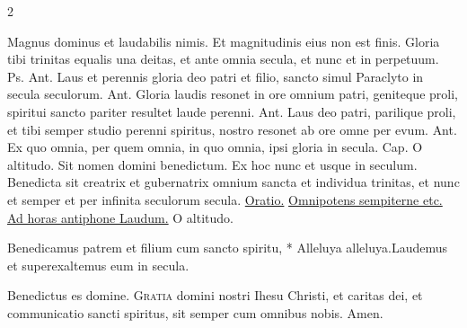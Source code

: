 \begin{multicols*}{2}
\begin{responsory-doxology}
\end{responsory-doxology}%
\newline \V Magnus dominus et laudabilis nimis. \R Et magnitudinis eius non est finis.
 Gloria tibi trinitas equalis una deitas, et ante omnia secula, et nunc et in perpetuum. {\color{Red} Ps.}  {\color{Red} Ant.} Laus et perennis gloria deo patri et filio, sancto simul Paraclyto in secula seculorum. {\color{Red} Ant.} Gloria laudis resonet in ore omnium patri, geniteque proli, spiritui sancto pariter resultet laude perenni. {\color{Red} Ant.} Laus deo patri, parilique proli, et tibi semper studio perenni spiritus, nostro resonet ab ore omne per evum. {\color{Red} Ant.} Ex quo omnia, per quem omnia, in quo omnia, ipsi gloria in secula. {\color{Red} Cap.} O altitudo.
\newline \V Sit nomen domini benedictum. \R Ex hoc nunc et usque in seculum.
 Benedicta sit creatrix et gubernatrix omnium sancta et individua trinitas, et nunc et semper et per infinita seculorum secula.
\newline \ul{Oratio.} \hyperlink{omnipotens-trinitas}{Omnipotens sempiterne etc.} \ul{Ad horas antiphone Laudum.}
 O altitudo.
\begin{responsory-breve}
{Benedicamus patrem et filium cum sancto spiritu, * Alleluya alleluya.}{Laudemus et superexaltemus eum in secula.}
\end{responsory-breve}%
\V Benedictus es domine.
\lettrine[lines=2]{\zallmancaps \color{Red} G}{ratia} domini nostri Ihesu Christi, et caritas dei, et communicatio sancti spiritus, sit semper cum omnibus nobis. Amen.

\end{multicols*}
